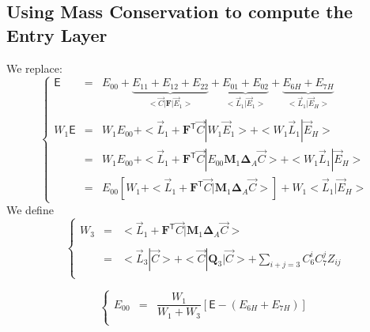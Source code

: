 \documentclass[aps,onecolumn,11pt]{revtex4}
\newcommand{\mytrn}[1]{{#1}^{\!\mathsf{T}}}
\newcommand{\mymat}[1]{{\bm{#1}}}
\begin{document}
\subsection{Using Mass Conservation to compute the Entry Layer}
We replace:
\begin{equation}
\left\lbrace
\begin{array}{rcl}
\mathsf{E}    & = & E_{00} 
+ \underbrace{E_{11}+E_{12}+E_{22}}_{<\vec{C}|\mymat{F}|\vec{E}_1>} 
+ \underbrace{E_{01}+E_{02}}_{<\vec{L}_1|\vec{E}_1>} 
+ \underbrace{E_{6H} + E_{7H}}_{<\vec{L}_1|\vec{E}_H>}\\
\\
W_1 \mathsf{E} & = & W_1 E_{00} + < \vec{L}_1 + \mytrn{\mymat{F}}\vec{C} | W_1 \vec{E}_1 > + <W_1 \vec{L}_1|\vec{E}_H> \\
& = & W_1 E_{00} + < \vec{L}_1 + \mytrn{\mymat{F}}\vec{C} | E_{00} \mymat{M}_1  \mymat{\Delta}_A \vec{C} > + <W_1 \vec{L}_1|\vec{E}_H> \\
& = & E_{00} \left[ W_1 + < \vec{L}_1 + \mytrn{\mymat{F}}\vec{C} | \mymat{M}_1  \mymat{\Delta}_A \vec{C} > \right] + W_1 <\vec{L}_1 | \vec{E}_H>
\end{array}
\right.
\end{equation}
We define
\begin{equation}
\left\lbrace
\begin{array}{rcl}
	W_3 & = & < \vec{L}_1 + \mytrn{\mymat{F}}\vec{C} | \mymat{M}_1  \mymat{\Delta}_A \vec{C} >\\
	\\
	& = & \displaystyle <\vec{L}_3|\vec{C}> + <\vec{C}|\mymat{Q}_3|\vec{C}> + \sum_{i+j=3}C_6^i C_7^j Z_{ij}  \\
\end{array}
\right.
\end{equation}

\begin{equation}
\left\lbrace
\begin{array}{rcl}
	E_{00}      &=&\dfrac{W_1}{W_1 + W_3} \left[\mathsf{E}-(E_{6H}+E_{7H})\right]\\
\end{array}
\right.
\end{equation}
\end{document}
